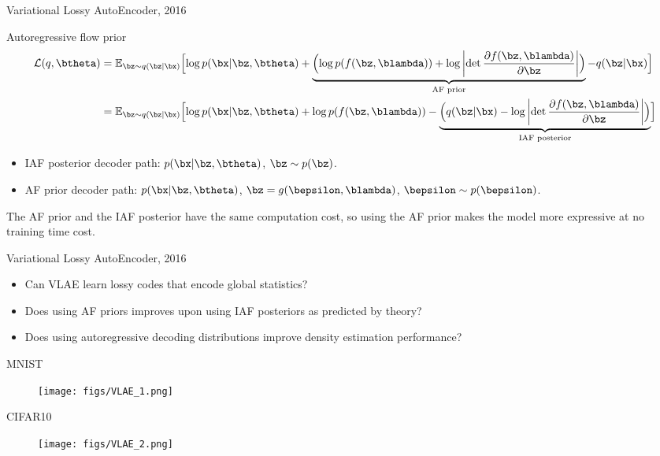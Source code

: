\begin{frame}{Variational Lossy AutoEncoder, 2016}
	\begin{block}{Autoregressive flow prior}
		{\footnotesize
		\begin{align*}
			\mathcal{L}(q, \btheta) &= \mathbb{E}_{\bz \sim q(\bz | \bx)} \Bigl[ \log p(\bx | \bz, \btheta) + \underbrace{ \Bigl( \log p(f(\bz, \blambda)) + \log \left| \det \frac{\partial f(\bz, \blambda)}{\partial \bz} \right| \Bigr) }_{\text{AF prior}} - q(\bz | \bx) \Bigr] \\
			&= \mathbb{E}_{\bz \sim q(\bz | \bx)} \Bigl[ \log p(\bx | \bz, \btheta) +  \log p(f(\bz, \blambda)) - \underbrace{ \Bigl( q(\bz | \bx) - \log \left| \det \frac{\partial f(\bz, \blambda)}{\partial \bz} \right| \Bigr) }_{\text{IAF posterior}} \Bigr]
		\end{align*}
		}
	\end{block}
	\begin{itemize}
		\item IAF posterior decoder path: $p(\bx|\bz, \btheta)$, $\bz \sim p(\bz)$.
		\item AF prior decoder path: $p(\bx|\bz, \btheta)$, $\bz = g(\bepsilon, \blambda)$, $\bepsilon \sim p(\bepsilon)$. 
	\end{itemize}
	The AF prior and the IAF posterior have the same computation cost, so using the AF prior makes the model more expressive at no training time cost.

\end{frame}
\begin{frame}{Variational Lossy AutoEncoder, 2016}
\begin{itemize}
    \item Can VLAE learn lossy codes that encode global statistics?
    \item Does using AF priors improves upon using IAF posteriors as predicted by theory?
    \item Does using autoregressive decoding distributions improve density estimation performance?
\end{itemize}
	\begin{minipage}[t]{0.5\columnwidth}
	\vspace{1cm}
		MNIST
		\begin{figure}[h]
			\centering
			\texttt{[image: figs/VLAE\_1.png]}
		\end{figure}
	\end{minipage}%
	\begin{minipage}[t]{0.5\columnwidth}
		CIFAR10
		\begin{figure}[h]
			\centering
			\texttt{[image: figs/VLAE\_2.png]}
		\end{figure}
	\end{minipage}

\end{frame}
